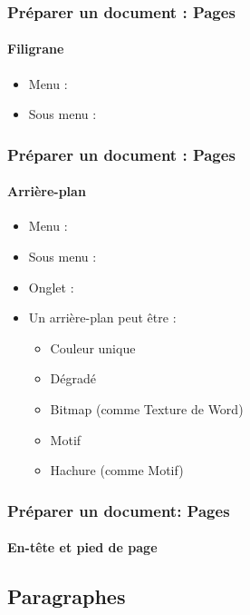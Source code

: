 \documentclass[xcolor=table]{beamer}
\begin{document}
\begin{frame}[t]
\frametitle{Préparer un document : Pages}
\framesubtitle{Filigrane}

\begin{minipage}{0.43\textwidth}
	\begin{itemize}
		\item Menu :  
		\item Sous menu : 
	\end{itemize}
\end{minipage}
\begin{minipage}{0.55\textwidth}
\end{minipage}

\end{frame}

\begin{frame}[t]
\frametitle{Préparer un document : Pages}
\framesubtitle{Arrière-plan}

\begin{minipage}{0.43\textwidth}
	\begin{itemize}
		\item Menu :  
		\item Sous menu : 
		\item Onglet : 
		\item Un arrière-plan peut être : 
		\begin{itemize}
			\item Couleur unique
			\item Dégradé
			\item Bitmap (comme Texture de Word)
			\item Motif
			\item Hachure (comme Motif)
		\end{itemize}
	\end{itemize}
\end{minipage}
\begin{minipage}{0.55\textwidth}
\end{minipage}

\end{frame}


\begin{frame}
\frametitle{Préparer un document: Pages}
\framesubtitle{En-tête et pied de page}

\end{frame}


\subsection{Paragraphes}
\end{document}
